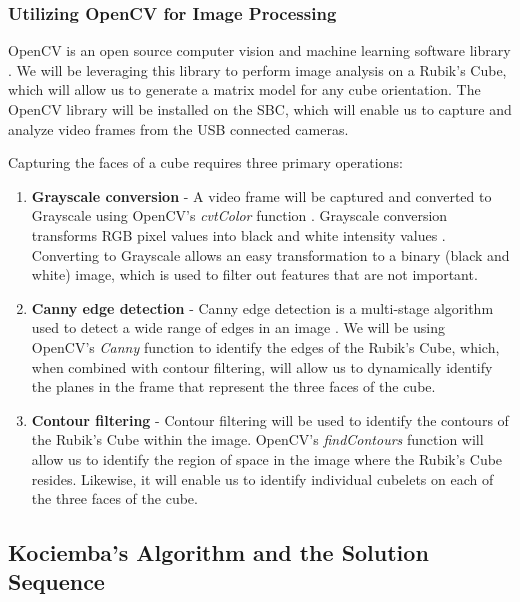\documentclass[11pt,english]{article}
\begin{document}
\subsubsection{Utilizing OpenCV for Image Processing}
\label{sec:image processing}
OpenCV is an open source computer vision and machine learning software library \cite{OpenCV}. We will be leveraging this library to perform image analysis on a Rubik's Cube, which will allow us to generate a matrix model for any cube orientation. The OpenCV library will be installed on the SBC, which will enable us to capture and analyze video frames from the USB connected cameras.

Capturing the faces of a cube requires three primary operations:

\begin{enumerate}
  \item \textbf{Grayscale conversion} -
 A video frame will be captured and converted to Grayscale using OpenCV's \textit{cvtColor} function \cite{cvtColor}. Grayscale conversion transforms RGB pixel values into black and white intensity values \cite{Grayscale}. Converting to Grayscale allows an easy transformation to a binary (black and white) image, which is used to filter out features that are not important.
  \item  \textbf{Canny edge detection} -
 Canny edge detection is a multi-stage algorithm used to detect a wide range of edges in an image \cite{Canny Edge Detection}. We will be using OpenCV's \textit{Canny} function \cite{OpenCV Canny} to identify the edges of the Rubik's Cube, which, when combined with contour filtering, will allow us to dynamically identify the planes in the frame that represent the three faces of the cube.

  \item \textbf{Contour filtering} -
 Contour filtering will be used to identify the contours of the Rubik's Cube within the image. OpenCV's \textit{findContours} function \cite{findContours} will allow us to identify the region of space in the image where the Rubik's Cube resides. Likewise, it will enable us to identify individual cubelets on each of the three faces of the cube.

\end{enumerate}



\subsection{Kociemba's Algorithm and the Solution Sequence}
\label{sec:Kociemba}
\end{document}
